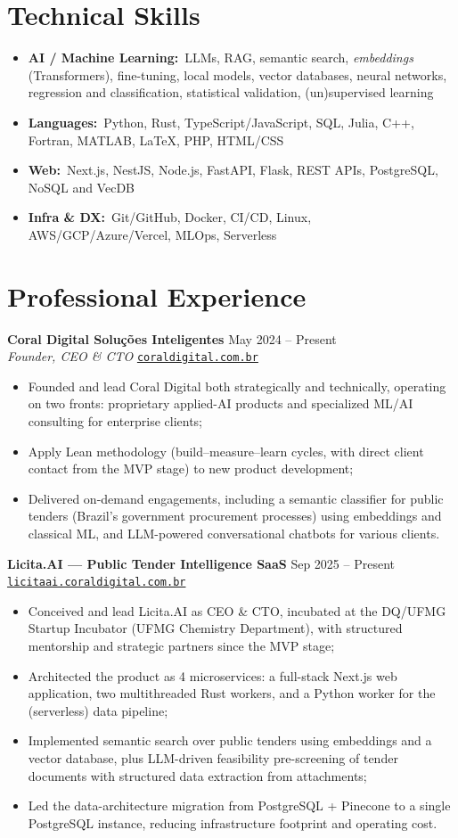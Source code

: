 \documentclass[10pt,a4paper]{article}
\newcommand{\entry}[4]{%
  \textbf{\sffamily\large #1} \hfill #2 \\
  {\itshape #3} \hfill {\small #4} \\[-0.75em]
}
\newcommand{\subentry}[2]{%
  \hspace{0.4em}\textbf{\sffamily #1} \hfill {\small #2}\\[-0.55em]
}
\newcommand*{\itemdesc}[2]{\item \textbf{\sffamily #1:}~{\small #2}}
\newcommand*{\link}[2]{\href{#1}{{\texttt{#2}}}}
\begin{document}
\section*{Technical Skills}
\begin{itemize}
\itemdesc{AI / Machine Learning}{LLMs, RAG, semantic search, \textit{embeddings} (Transformers), fine-tuning, local models, vector databases, neural networks, regression and classification, statistical validation, (un)supervised learning}
\itemdesc{Languages}{Python, Rust, TypeScript/JavaScript, SQL, Julia, C++, Fortran, MATLAB, \LaTeX, PHP, HTML/CSS}
\itemdesc{Web}{Next.js, NestJS, Node.js, FastAPI, Flask, REST APIs, PostgreSQL, NoSQL and VecDB}
\itemdesc{Infra \& DX}{Git/GitHub, Docker, CI/CD, Linux, AWS/GCP/Azure/Vercel, MLOps, Serverless}
\end{itemize}

\section*{Professional Experience}

\entry{Coral Digital Soluções Inteligentes}{May 2024 -- Present}{Founder, CEO \& CTO}{\link{https://coraldigital.com.br}{coraldigital.com.br}}
\begin{itemize}\footnotesize
  \item Founded and lead Coral Digital both strategically and technically, operating on two fronts: proprietary applied-AI products and specialized ML/AI consulting for enterprise clients;
  \item Apply Lean methodology (build--measure--learn cycles, with direct client contact from the MVP stage) to new product development;
  \item Delivered on-demand engagements, including a semantic classifier for public tenders (Brazil's government procurement processes) using embeddings and classical ML, and LLM-powered conversational chatbots for various clients.
\end{itemize}

\subentry{Licita.AI --- Public Tender Intelligence SaaS}{Sep 2025 -- Present \textbar{} \link{https://licitaai.coraldigital.com.br}{licitaai.coraldigital.com.br}}
\begin{itemize}[leftmargin=2.2em]\footnotesize
  \item Conceived and lead Licita.AI as CEO \& CTO, incubated at the DQ/UFMG Startup Incubator (UFMG Chemistry Department), with structured mentorship and strategic partners since the MVP stage;
  \item Architected the product as 4 microservices: a full-stack Next.js web application, two multithreaded Rust workers, and a Python worker for the (serverless) data pipeline;
  \item Implemented semantic search over public tenders using embeddings and a vector database, plus LLM-driven feasibility pre-screening of tender documents with structured data extraction from attachments;
  \item Led the data-architecture migration from PostgreSQL + Pinecone to a single PostgreSQL instance, reducing infrastructure footprint and operating cost.
\end{itemize}
\end{document}
